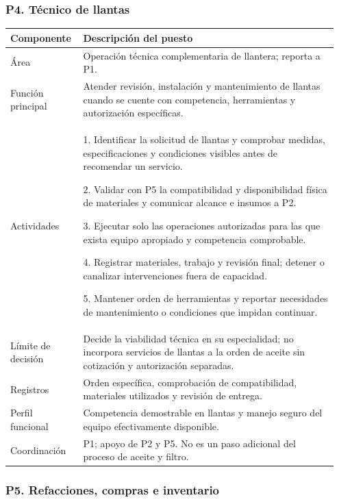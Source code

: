 {\par\medskip\noindent\begin{minipage}{\linewidth}\subsubsection*{P4. Técnico de llantas}
{\small\renewcommand{\arraystretch}{1.15}\begin{tabular}{@{}p{0.20\linewidth}p{0.75\linewidth}@{}}\toprule
\textbf{Componente} & \textbf{Descripción del puesto} \\ \midrule
Área & Operación técnica complementaria de llantera; reporta a P1. \\ \midrule
Función principal & Atender revisión, instalación y mantenimiento de llantas cuando se cuente con competencia, herramientas y autorización específicas. \\ \midrule
Actividades & 1. Identificar la solicitud de llantas y comprobar medidas, especificaciones y condiciones visibles antes de recomendar un servicio.\par 2. Validar con P5 la compatibilidad y disponibilidad física de materiales y comunicar alcance e insumos a P2.\par 3. Ejecutar solo las operaciones autorizadas para las que exista equipo apropiado y competencia comprobable.\par 4. Registrar materiales, trabajo y revisión final; detener o canalizar intervenciones fuera de capacidad.\par 5. Mantener orden de herramientas y reportar necesidades de mantenimiento o condiciones que impidan continuar. \\ \midrule
Límite de decisión & Decide la viabilidad técnica en su especialidad; no incorpora servicios de llantas a la orden de aceite sin cotización y autorización separadas. \\ \midrule
Registros & Orden específica, comprobación de compatibilidad, materiales utilizados y revisión de entrega. \\ \midrule
Perfil funcional & Competencia demostrable en llantas y manejo seguro del equipo efectivamente disponible. \\ \midrule
Coordinación & P1; apoyo de P2 y P5. No es un paso adicional del proceso de aceite y filtro. \\ \midrule
\end{tabular}}\end{minipage}\par\medskip
\par\medskip\noindent\begin{minipage}{\linewidth}\subsubsection*{P5. Refacciones, compras e inventario}

\end{minipage}}
